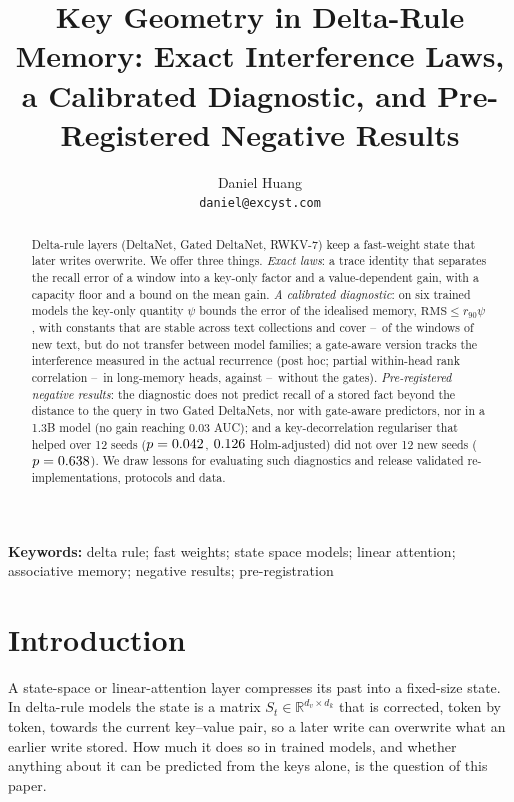 \documentclass{article}
\title{Key Geometry in Delta-Rule Memory: Exact Interference Laws, a Calibrated Diagnostic, and Pre-Registered Negative Results}
\author{
  Daniel Huang \\
  \texttt{daniel@excyst.com} \\
}
\date{}
\newcommand{\keywords}[1]{\par\medskip\noindent\textbf{Keywords:} #1}
\newcommand{\R}{\mathbb{R}}
\begin{document}
\maketitle

\begin{abstract}
Delta-rule layers (DeltaNet, Gated DeltaNet, RWKV-7) keep a fast-weight state that later writes overwrite. We offer three things. \emph{Exact laws}: a trace identity that separates the recall error of a window into a key-only factor and a value-dependent gain, with a capacity floor and a bound on the mean gain. \emph{A calibrated diagnostic}: on six trained models the key-only quantity $\psi$ bounds the error of the idealised memory, $\mathrm{RMS}\le r_{90}\psi$, with constants that are stable across text collections and cover \heldCovLo--\heldCovHi\ of the windows of new text, but do not transfer between model families; a gate-aware version tracks the interference measured in the actual recurrence (post hoc; partial within-head rank correlation \gatePartLo--\gatePartHi\ in long-memory heads, against \freePartLo--\freePartHi\ without the gates). \emph{Pre-registered negative results}: the diagnostic does not predict recall of a stored fact beyond the distance to the query in two Gated DeltaNets, nor with gate-aware predictors, nor in a 1.3B model (no gain reaching 0.03 AUC); and a key-decorrelation regulariser that helped over 12 seeds ($p=0.042$, $0.126$ Holm-adjusted) did not over 12 new seeds ($p=0.638$). We draw lessons for evaluating such diagnostics and release validated re-implementations, protocols and data.
\end{abstract}

\keywords{delta rule; fast weights; state space models; linear attention; associative memory; negative results; pre-registration}

\section{Introduction}
A state-space or linear-attention layer compresses its past into a fixed-size state. In delta-rule models the state is a matrix $S_t\in\R^{d_v\times d_k}$ that is corrected, token by token, towards the current key--value pair, so a later write can overwrite what an earlier write stored. How much it does so in trained models, and whether anything about it can be predicted from the keys alone, is the question of this paper.
\end{document}
